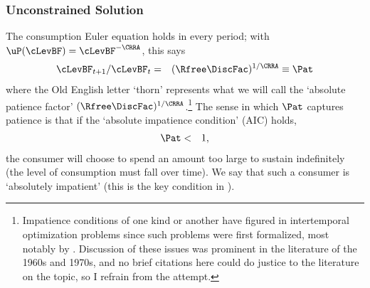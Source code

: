 \documentclass[titlepage]{\econtex}\providecommand{\texname}{BufferStockTheory}%
\begin{document}
\subsubsection{Unconstrained Solution} \label{subsec:PFUncon}

\hypertarget{AIC}{}
The consumption Euler equation holds in every period; with $\uP(\cLevBF)=\cLevBF^{-\CRRA}$, this says
\begin{eqnarray}
 \cLevBF_{t+1}/\cLevBF_{t} & = & (\Rfree\DiscFac)^{1/\CRRA} \equiv \Pat \label{eq:cGrowPF} \label{eq:Pat}
\end{eqnarray}
where the Old English letter `thorn' represents what we will call the
`absolute patience factor' $(\Rfree
\DiscFac)^{1/\CRRA}$.\footnote{Impatience conditions of one kind or
  another have figured in intertemporal optimization problems since
  such problems were first formalized, most notably by \cite{ramseySave}.
  Discussion of these issues was prominent in the literature of the
  1960s and 1970s, and no brief citations here could do justice to the literature on the topic, so I refrain from the attempt.}  The sense in which $\Pat$ captures
patience is that if the `absolute impatience condition' (AIC) holds,
\begin{eqnarray}
  \label{eq:AIC}
  \Pat & < & 1,
\end{eqnarray}
the consumer will choose to spend an amount too large to sustain indefinitely (the
level of consumption must fall over time).  We say that such a consumer is
`absolutely impatient' (this is the key condition in \cite{bewleyPIH}).
\end{document}
